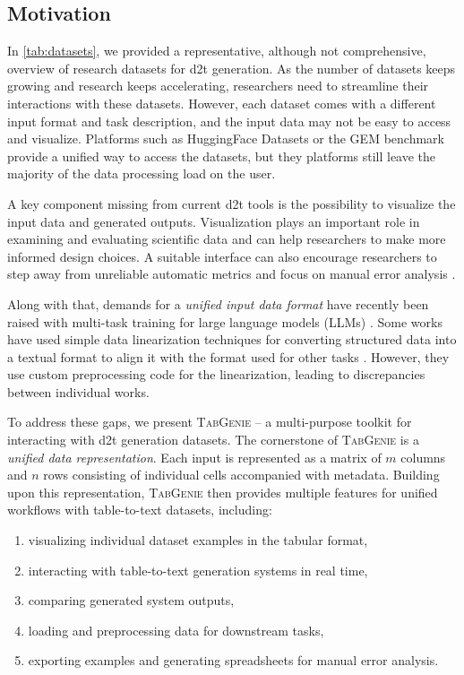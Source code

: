 \subsection{Motivation}
\label{sec:tabgenie:motivation}
In \autoref{tab:datasets}, we provided a representative, although not comprehensive, overview of research datasets for \ac{d2t} generation. As the number of datasets keeps growing and research keeps accelerating, researchers need to streamline their interactions with these datasets. However, each dataset comes with a different input format and task description, and the input data may not be easy to access and visualize.  Platforms such as HuggingFace Datasets \cite{lhoest2021datasets} or the GEM benchmark \cite{gehrmannGEMBenchmarkNatural2021}  provide a unified way to access the datasets, but they platforms still leave the majority of the data processing load on the user.

A key component missing from current \ac{d2t} tools is the possibility to visualize the input data and generated outputs. Visualization plays an important role in examining and evaluating scientific data \cite{Kehrer2013VisualizationAV} and can help researchers to make more informed design choices. A suitable interface can also encourage researchers to step away from unreliable automatic metrics \cite{gehrmannRepairingCrackedFoundation2022} and focus on manual error analysis \cite{van_miltenburg_underreporting_2021,van_miltenburg_barriers_2023}.

Along with that, demands for a \textit{unified input data format} have recently been raised with multi-task training for large language models (LLMs) \citep[\textit{inter alia}]{sanh2021multitask,scao2022bloom,ouyang2022TrainingLM}. Some works have used simple data linearization techniques for converting structured data into a textual format to align it with the format used for other tasks \cite{xieUnifiedSKGUnifyingMultiTasking2022,tang2022mvp}. However, they use custom preprocessing code for the linearization, leading to discrepancies between individual works.

To address these gaps, we present \textsc{TabGenie} -- a multi-purpose toolkit for interacting with \ac{d2t} generation datasets. The cornerstone of \textsc{TabGenie} is a \emph{unified data representation}. Each input is represented as a matrix of $m$ columns and $n$ rows consisting of individual cells accompanied with metadata. Building upon this representation, \textsc{TabGenie} then provides multiple features for unified workflows with table-to-text datasets, including:
\begin{enumerate}
    \item visualizing individual dataset examples in the tabular format,
    \item interacting with table-to-text generation systems in real time,
    \item comparing generated system outputs,
    \item loading and preprocessing data for downstream tasks,
    \item exporting examples and generating spreadsheets for manual error analysis.
\end{enumerate}

